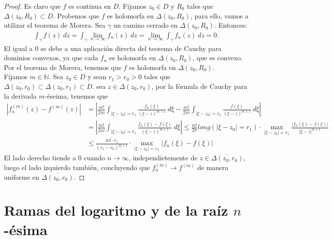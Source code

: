 \begin{proof}
Es claro que $f$ es continua en $D$. Fijamos $z_0 \in D$ y $R_0$ tales que $\Delta(z_0,R_0) \subset D$. Probemos que $f$ es holomorfa en $\Delta(z_0,R_0)$, para ello, vamos a utilizar el teorema de Morera. Sea $\gamma$ un camino cerrado en $\Delta(z_0,R_0)$. Entonces:
\begin{align*}
    \int_{\gamma} f(z) \ dz = \int_{\gamma} \lim_{n \to \infty} f_n(z) \ dz = \lim_{n \to \infty} \int_{\gamma} f_n(z) \ dz = 0.
\end{align*}
El igual a 0 se debe a una aplicación directa del teorema de Cauchy para dominios convexos, ya que cada $f_n$ es holomorfa en $\Delta(z_0,R_0)$, que es convexo. Por el teorema de Morera, tenemos que $f$ es holomorfa en $\Delta(z_0,R_0)$.
\\
\newline
Fijamos $m \in \mathbb{N}$. Sea $z_0 \in D$ y sean $r_1 > r_0 > 0$ tales que
$\overline{\Delta(z_0,r_0)} \subset \overline{\Delta(z_0,r_1)} \subset D$. sea $z \in \Delta(z_0,r_0)$, por la fórmula de Cauchy para la derivada $m$-éseima, tenemos que
\begin{align*}
    \left| f_n^{(m)}(z) - f^{(m)}(z) \right| &= \left| \frac{m!}{2\pi i}  \int_{|\xi - z_0| = r_1} \frac{f_n(\xi)}{(\xi - z)^{m+1}} \ d\xi - \frac{m!}{2\pi i} \int_{|\xi - z_0| = r_1} \frac{f(\xi)}{(\xi - z)^{m+1}} \ d\xi \right| \\
    &= \left| \frac{m!}{2\pi i} \int_{|\xi - z_0| = r_1} \frac{f_n(\xi) - f(\xi)}{(\xi - z)^{m+1}} \ d\xi \right| \leq \frac{m!}{2\pi} long(|\xi - z_0| = r_1) \cdot \max_{|\xi - z_0| = r_1} \frac{|f_n(\xi) - f(\xi)|}{|\xi - z|^{m+1}} \\
    & \leq \frac{m! \cdot r_1}{(r_1 - r_0)^{m+1}} \cdot \max_{|\xi - z_0| = r_1} |f_n(\xi) - f(\xi)| 
\end{align*}
El lado derecho tiende a 0 cuando $n \to \infty$, independietemente de $z \in \overline{\Delta(z_0,r_0)}$, luego el lado izquierdo también, concluyendo que $f_n^{(m)} \to f^{(m)}$ de manera uniforme en $\overline{\Delta(z_0,r_0)}$.
\end{proof}

\section{Ramas del logaritmo y de la raíz $n$-ésima}

